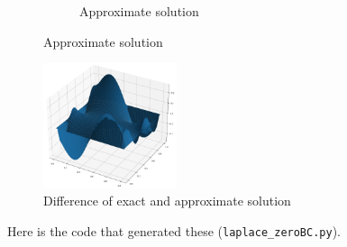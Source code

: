 \documentclass[boxes,pages]{homework}
\begin{document}
\begin{solution}
\begin{figure}[h]
\begin{subfigure}{.5\textwidth}
			\caption{Approximate solution}
			\label{fig:sub2}
		\end{subfigure}
	\end{figure}
	\begin{figure}[h]
		\centering
		\includegraphics[width=0.35\textwidth]{problemThree/error.png}
		\caption{Difference of exact and approximate solution}
	\end{figure}
	Here is the code that generated these (\verb+laplace_zeroBC.py+).
	


\end{solution}
\end{document}
